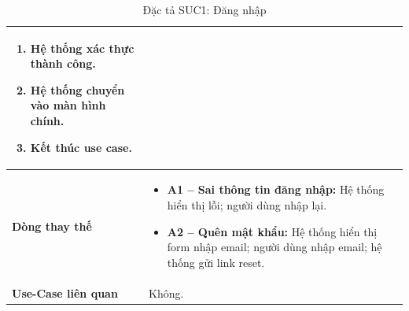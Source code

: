 \begin{table}[H]
\begin{tabularx}{\textwidth}{|>{\centering\arraybackslash\bfseries}m{3.5cm}|X|}
\begin{enumerate}[leftmargin=*, nosep]
        \item Hệ thống xác thực thành công.
        \item Hệ thống chuyển vào màn hình chính.
        \item Kết thúc use case.
    \end{enumerate} \\
    \hline
    Dòng thay thế &
    \begin{itemize}[leftmargin=*, nosep, label=-]
        \vspace{0.1cm}
        \item \textbf{A1 -- Sai thông tin đăng nhập:} Hệ thống hiển thị lỗi; người dùng nhập lại.
        \item \textbf{A2 -- Quên mật khẩu:} Hệ thống hiển thị form nhập email; người dùng nhập email; hệ thống gửi link reset.
    \end{itemize} \\
    \hline
    Use-Case liên quan & Không. \\
    \hline
\end{tabularx}
\caption{Đặc tả SUC1: Đăng nhập}
\end{table}


\vspace{1cm}

